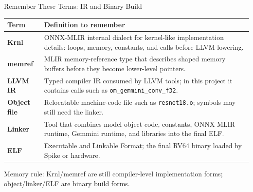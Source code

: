 \documentclass[aspectratio=169,10pt]{beamer}
\newcommand{\code}[1]{\texttt{\footnotesize #1}}
\newcommand{\edgeword}[1]{\textcolor{red!75!black}{\textbf{#1}}}
\begin{document}
\begin{frame}{Remember These Terms: IR and Binary Build}
  \scriptsize
  \begin{tabularx}{\textwidth}{@{}lX@{}}
    \toprule
    Term & Definition to remember \\
    \midrule
    \edgeword{Krnl} &
      ONNX-MLIR internal dialect for kernel-like implementation details: loops, memory, constants, and calls before LLVM lowering. \\
    \edgeword{memref} &
      MLIR memory-reference type that describes shaped memory buffers before they become lower-level pointers. \\
    \edgeword{LLVM IR} &
      Typed compiler IR consumed by LLVM tools; in this project it contains calls such as \code{om\_gemmini\_conv\_f32}. \\
    \edgeword{Object file} &
      Relocatable machine-code file such as \code{resnet18.o}; symbols may still need the linker. \\
    \edgeword{Linker} &
      Tool that combines model object code, constants, ONNX-MLIR runtime, Gemmini runtime, and libraries into the final ELF. \\
    \edgeword{ELF} &
      Executable and Linkable Format; the final RV64 binary loaded by Spike or hardware. \\
    \bottomrule
  \end{tabularx}
  \vspace{0.35em}
  {\tiny\color{codegray}
  Memory rule: Krnl/memref are still compiler-level implementation forms; object/linker/ELF are binary build forms.}
\end{frame}
\end{document}
